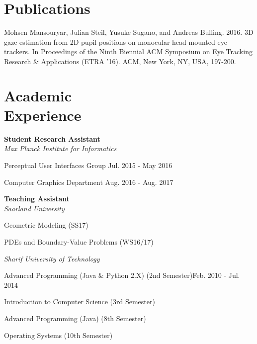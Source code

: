 \documentclass[margin,line]{resume}
\begin{document}
\begin{resume}
    \section{\mysidestyle Publications}

    Mohsen Mansouryar, Julian Steil, Yusuke Sugano, and Andreas Bulling. 2016. 3D gaze estimation
    from 2D pupil positions on monocular head-mounted eye trackers. In Proceedings of the Ninth
    Biennial ACM Symposium on Eye Tracking Research \& Applications (ETRA ’16). ACM, New York,
    NY, USA, 197-200.
    
    \section{\mysidestyle Academic\\Experience}

	{\bf Student Research Assistant}\vspace{1mm}\\
	{\sl Max Planck Institute for Informatics}
	\begin{list2}
		\item Perceptual User Interfaces Group \hfill {\sf Jul. 2015 - May 2016}
		\item Computer Graphics Department \hfill {\sf Aug. 2016 - Aug. 2017}
	\end{list2}

    {\bf Teaching Assistant}\vspace{1mm}\\
    {\sl Saarland University}
    \begin{list2}
    	\item Geometric Modeling (SS17)
    	\item PDEs and Boundary-Value Problems (WS16/17) 
    \end{list2}
    {\sl Sharif University of Technology} 
    \begin{list2}
        \item Advanced Programming (Java \& Python 2.X) (2nd Semester)\hfill {\sf Feb. 2010 - Jul. 2014}
        \item Introduction to Computer Science (3rd Semester)
        \item Advanced Programming (Java) (8th Semester)
        \item Operating Systems (10th Semester)
    \end{list2}
    

\end{resume}
\end{document}
